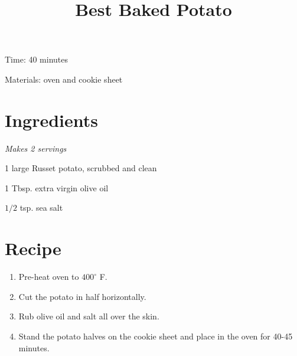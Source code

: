 \documentclass{article}
\title{Best Baked Potato}
\begin{document}
Time: 40 minutes

Materials: oven and cookie sheet

\section{Ingredients}
\textit{Makes 2 servings}

1 large Russet potato, scrubbed and clean

1 Tbsp. extra virgin olive oil

$1/2$ tsp. sea salt

\section{Recipe}
\begin{enumerate}
\item{Pre-heat oven to $400^{\circ}$ F.}
\item{Cut the potato in half horizontally.}
\item{Rub olive oil and salt all over the skin.}
\item{Stand the potato halves on the cookie sheet and place in the oven for 40-45 minutes.}
\end{enumerate}
\end{document}
